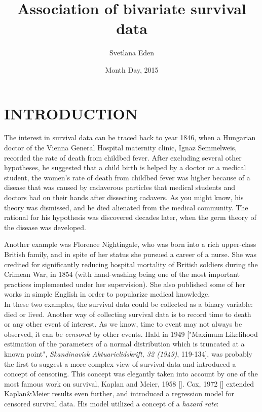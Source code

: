 \documentclass[]{article}
\title{Association of bivariate survival data}
\author{Svetlana Eden}
\date{Month Day, 2015}
\begin{document}
\maketitle
\tableofcontents
\listoffigures
\listoftables
\clearpage

\section{INTRODUCTION}
The interest in survival data can be traced back to year 1846, when a Hungarian doctor of the Vienna General Hospital maternity clinic, Ignaz Semmelweis, recorded the rate of death from childbed fever. After excluding several other hypotheses, he suggested that a child birth is helped by a doctor or a medical student, the women's rate of death from childbed fever was higher because of a disease that was caused by cadaverous particles that medical students and doctors had on their hands after dissecting cadavers. As you might know, his theory was dismissed, and he died alienated from the medical community. The rational for his hypothesis was discovered decades later, when the germ theory of the disease was developed. 


Another example was Florence Nightingale, who was born into a rich upper-class British family, and in spite of her status she pursued a career of a nurse. She was credited for significantly reducing hospital mortality of British soldiers during the Crimean War, in 1854 (with hand-washing being one of the most important practices implemented under her supervision). She also published some of her works in simple English in order to popularize medical knowledge.\\
In these two examples, the survival data could be collected as a binary variable: died or lived.  Another way of collecting survival data is to record time to death or any other event of interest. As we know, time to event may not always be observed, it can be \emph{censored} by other events. Hald in 1949 ["Maximum Likelihood estimation of the parameters of a normal distribution which is truncated at a known point", \emph{Skandinavisk Aktuarielidskrift, 32 (1949)}, 119-134], was probably the first to suggest a more complex view of survival data and introduced a concept of censoring. This concept was elegantly taken into account by one of the most famous work on survival, Kaplan and Meier, 1958 [\cite{kaplan1958nonparametric}]. Cox, 1972 [\cite{cox1992regression}] extended Kaplan\&Meier results even further, and introduced a regression model for censored survival data. His model utilized a concept of a \emph{hazard rate}:
\end{document}
